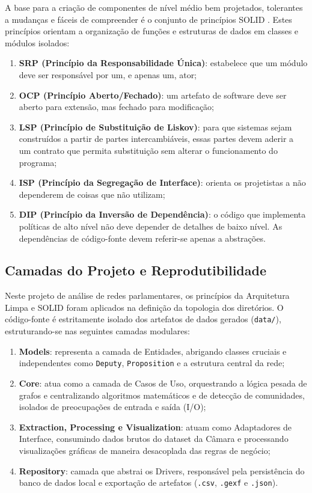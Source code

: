 \documentclass[
      12pt,
      a4paper,
      openright,
      oneside,
      chapter=TITLE,
      section=TITLE,
      english,
      french,
      spanish,
      brazilian
    ]{abntex2}
\begin{document}
    A base para a criação de componentes de nível médio bem projetados, tolerantes a mudanças e fáceis de compreender é o conjunto de princípios SOLID \cite{martin2017}. Estes princípios orientam a organização de funções e estruturas de dados em classes e módulos isolados:
    
    \begin{enumerate}[label=\alph*)]
        \item \textbf{SRP (Princípio da Responsabilidade Única)}: estabelece que um módulo deve ser responsável por um, e apenas um, ator;
        \item \textbf{OCP (Princípio Aberto/Fechado)}: um artefato de software deve ser aberto para extensão, mas fechado para modificação;
        \item \textbf{LSP (Princípio de Substituição de Liskov)}: para que sistemas sejam construídos a partir de partes intercambiáveis, essas partes devem aderir a um contrato que permita substituição sem alterar o funcionamento do programa;
        \item \textbf{ISP (Princípio da Segregação de Interface)}: orienta os projetistas a não dependerem de coisas que não utilizam;
        \item \textbf{DIP (Princípio da Inversão de Dependência)}: o código que implementa políticas de alto nível não deve depender de detalhes de baixo nível. As dependências de código-fonte devem referir-se apenas a abstrações.
    \end{enumerate}
    
    \subsection{Camadas do Projeto e Reprodutibilidade}
    
    Neste projeto de análise de redes parlamentares, os princípios da Arquitetura Limpa e SOLID foram aplicados na definição da topologia dos diretórios. O código-fonte é estritamente isolado dos artefatos de dados gerados (\texttt{data/}), estruturando-se nas seguintes camadas modulares:
    
    \begin{enumerate}[label=\alph*)]
        \item \textbf{Models}: representa a camada de Entidades, abrigando classes cruciais e independentes como \texttt{Deputy}, \texttt{Proposition} e a estrutura central da rede;
        \item \textbf{Core}: atua como a camada de Casos de Uso, orquestrando a lógica pesada de grafos e centralizando algoritmos matemáticos e de detecção de comunidades, isolados de preocupações de entrada e saída (I/O);
        \item \textbf{Extraction, Processing e Visualization}: atuam como Adaptadores de Interface, consumindo dados brutos do dataset da Câmara e processando visualizações gráficas de maneira desacoplada das regras de negócio;
        \item \textbf{Repository}: camada que abstrai os Drivers, responsável pela persistência do banco de dados local e exportação de artefatos (\texttt{.csv}, \texttt{.gexf} e \texttt{.json}).
    \end{enumerate}
    
\end{document}
